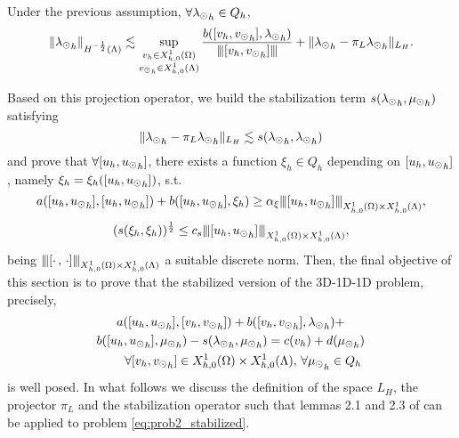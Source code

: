 \begin{lemma}\cite[Lemma2.1]{burman2014}
Under the previous assumption, $\forall {\lambda_{\odot}}_h \in Q_h$,
\begin{equation*}
\|{\lambda_{\odot}}_h\|_{H^{-\frac 12}(\Lambda)} \lesssim \sup_{\substack{v_h \in X_{h,0}^1(\Omega)\\ {v_{\odot}}_h \in X_{h,0}^1(\Lambda)}} \frac{b([v_h, {v_{\odot}}_h], {\lambda_{\odot}}_h)}{{\left\vert\kern-0.25ex\left\vert\kern-0.25ex\left\vert [v_h, {v_{\odot}}_h] \right\vert\kern-0.25ex\right\vert\kern-0.25ex\right\vert}} + \|{\lambda_{\odot}}_h - \pi_L {\lambda_{\odot}}_h\|_{L_H}.
\end{equation*}
\end{lemma}
 Based on this projection operator, we build the stabilization term $s({\lambda_{\odot}}_h, {\mu_{\odot}}_h)$ satisfying
 \begin{equation*}
 \|{\lambda_{\odot}}_h- \pi_L {\lambda_{\odot}}_h\|_{L_H} \lesssim s({\lambda_{\odot}}_h, {\lambda_{\odot}}_h)
\end{equation*}  and prove that $\forall [u_h, {u_{\odot}}_h]$, there exists a function $\xi_h\in Q_h$ depending on $[u_h, {u_{\odot}}_h]$, namely $\xi_h=\xi_h([u_h, {u_{\odot}}_h])$, s.t.
\begin{equation}\label{stab_coercivity}
a([u_h, {\ud}_h],[u_h, {\ud}_h] ) + b([u_h, {\ud}_h], \xi_h) \geq \alpha_\xi \vertiii{[u_h, {\ud}_h]}_{X_{h,0}^1(\Omega)\times X_{h,0}^1(\Lambda) },
\end{equation}
\begin{equation}\label{stab_stability}
(s(\xi_{h}, \xi_{h}))^{\frac 12} \leq c_s \vertiii{[u_h, {\ud}_h]}_{X_{h,0}^1(\Omega)\times X_{h,0}^1(\Lambda) },
\end{equation}
being ${\left\vert\kern-0.25ex\left\vert\kern-0.25ex\left\vert [\cdot \, ,\, \cdot]  \right\vert\kern-0.25ex\right\vert\kern-0.25ex\right\vert}_{X_{h,0}^1(\Omega)\times X_{h,0}^1(\Lambda) }$ a suitable discrete norm. Then, the final objective of this section is to prove that the stabilized version of the 3D-1D-1D problem, precisely,
\begin{multline}\label{eq:prob2_stabilized}
a([u_h, {\ud}_h], [v_h, {\vd}_h]) +
b([v_h, {\vd}_h], {\ld}_h) +\\
b([u_h, {\ud}_h], {\md}_h) 
- s({\ld}_h, {\md}_h) = c(v_h) + d({\md}_h)\\
  \qquad \forall [v_h, {\vd}_h] \in {X_{h,0}^1(\Omega)\times X_{h,0}^1(\Lambda), \, \forall \md}_h \in Q_h
\end{multline}
is well posed.
In what follows we discuss the definition of the space $L_H$, the projector $\pi_L$ and the stabilization operator such that lemmas 2.1 and 2.3 of \cite{burman2014} can be applied to problem \eqref{eq:prob2_stabilized}. 
